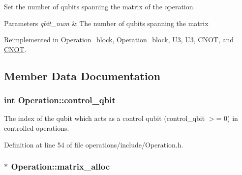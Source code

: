 Set the number of qubits spanning the matrix of the operation. 


\begin{DoxyParams}{Parameters}
{\em qbit\+\_\+num} & The number of qubits spanning the matrix \\
\hline
\end{DoxyParams}


Reimplemented in \hyperlink{class_operation__block_acc41ac933723558df3f4e65ae1158091}{Operation\+\_\+block}, \hyperlink{class_operation__block_acc41ac933723558df3f4e65ae1158091}{Operation\+\_\+block}, \hyperlink{class_u3_acba4c571368bbd628b817b89d96a6ab3}{U3}, \hyperlink{class_u3_acba4c571368bbd628b817b89d96a6ab3}{U3}, \hyperlink{class_c_n_o_t_a8272bf6e7ce6705a87d1ae9ef1e09418}{C\+N\+OT}, and \hyperlink{class_c_n_o_t_a8272bf6e7ce6705a87d1ae9ef1e09418}{C\+N\+OT}.



\subsection{Member Data Documentation}
\subsubsection[{\texorpdfstring{control\+\_\+qbit}{control_qbit}}]{\setlength{\rightskip}{0pt plus 5cm}int Operation\+::control\+\_\+qbit\hspace{0.3cm}{\ttfamily [protected]}}\hypertarget{class_operation_a9a798ea8adec5a45fd2ca07996da88e1}{}\label{class_operation_a9a798ea8adec5a45fd2ca07996da88e1}


The index of the qubit which acts as a control qubit (control\+\_\+qbit $>$= 0) in controlled operations. 



Definition at line 54 of file operations/include/\+Operation.\+h.

\subsubsection[{\texorpdfstring{matrix\+\_\+alloc}{matrix_alloc}}]{ $\ast$ Operation\+::matrix\+\_\+alloc\hspace{0.3cm}{\ttfamily [protected]}}\hypertarget{class_operation_ade4d28d271ca13950d04363aac1c382e}{}\label{class_operation_ade4d28d271ca13950d04363aac1c382e}


